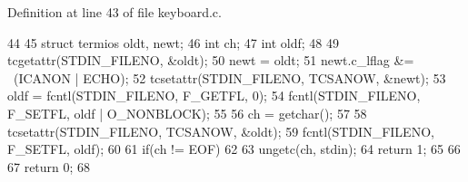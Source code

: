 Definition at line 43 of file keyboard.c.


\begin{DoxyCode}
44 {
45         struct termios oldt, newt;
46         int ch;
47         int oldf;
48 
49         tcgetattr(STDIN_FILENO, &oldt);
50         newt = oldt;
51         newt.c_lflag &= ~(ICANON | ECHO);
52         tcsetattr(STDIN_FILENO, TCSANOW, &newt);
53         oldf = fcntl(STDIN_FILENO, F_GETFL, 0);
54         fcntl(STDIN_FILENO, F_SETFL, oldf | O_NONBLOCK);
55 
56         ch = getchar();
57 
58         tcsetattr(STDIN_FILENO, TCSANOW, &oldt);
59         fcntl(STDIN_FILENO, F_SETFL, oldf);
60 
61         if(ch != EOF)
62         {
63         ungetc(ch, stdin);
64         return 1;
65         }
66 
67         return 0;
68 }
\end{DoxyCode}
